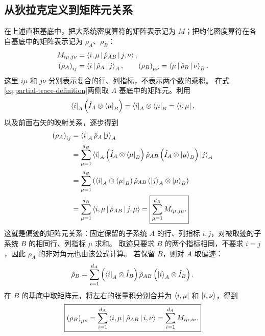 \subsection{从狄拉克定义到矩阵元关系}
在上述直积基底中，把大系统密度算符的矩阵表示记为 $M$；把约化密度算符在各自基底中的矩阵表示记为 $\rho_A$、$\rho_B$：
\begin{align}
M_{i\mu,j\nu}&=\Braket{i,\mu|\hat\rho_{AB}|j,\nu},\\
\left(\rho_A\right)_{ij}&=\Braket{i|\hat\rho_A|j}_A,\qquad
\left(\rho_B\right)_{\mu\nu}=\Braket{\mu|\hat\rho_B|\nu}_B.
\end{align}
这里 $i\mu$ 和 $j\nu$ 分别表示复合的行、列指标，不表示两个数的乘积。
在式\eqref{eq:partial-trace-definition}两侧取 $A$ 基底中的矩阵元。利用
\begin{equation}
\Bra{i}_A\left(\hat I_A\otimes\Bra{\mu}_B\right)
=\Bra{i}_A\otimes\Bra{\mu}_B=\Bra{i,\mu},
\end{equation}
以及前面右矢的映射关系，逐步得到
\begin{align}
\left(\rho_A\right)_{ij}
&=\Bra{i}_A\hat\rho_A\Ket{j}_A\notag\\
&=\sum_{\mu=1}^{d_B}
\Bra{i}_A\left(\hat I_A\otimes\Bra{\mu}_B\right)
\hat\rho_{AB}
\left(\hat I_A\otimes\Ket{\mu}_B\right)\Ket{j}_A\notag\\
&=\sum_{\mu=1}^{d_B}
\left(\Bra{i}_A\otimes\Bra{\mu}_B\right)
\hat\rho_{AB}
\left(\Ket{j}_A\otimes\Ket{\mu}_B\right)\notag\\
&=\sum_{\mu=1}^{d_B}\Braket{i,\mu|\hat\rho_{AB}|j,\mu}
=\boxed{\sum_{\mu=1}^{d_B}M_{i\mu,j\mu}.}
\label{eq:partial-trace-elements-A}
\end{align}
这就是偏迹的矩阵元关系：固定保留的子系统 $A$ 的行、列指标 $i,j$，对被取迹的子系统 $B$ 的相同行、列指标 $\mu$ 求和。
取迹只要求 $B$ 的两个指标相同，不要求 $i=j$，因此 $\rho_A$ 的非对角元也由该公式计算。
若保留 $B$，则对 $A$ 取偏迹：
\begin{equation}
\hat\rho_B=\sum_{i=1}^{d_A}
\left(\Bra{i}_A\otimes\hat I_B\right)
\hat\rho_{AB}
\left(\Ket{i}_A\otimes\hat I_B\right).
\end{equation}
在 $B$ 的基底中取矩阵元，将左右的张量积分别合并为 $\Bra{i,\mu}$ 和 $\Ket{i,\nu}$，得到
\begin{equation}
\boxed{\left(\rho_B\right)_{\mu\nu}
=\sum_{i=1}^{d_A}\Braket{i,\mu|\hat\rho_{AB}|i,\nu}
=\sum_{i=1}^{d_A}M_{i\mu,i\nu}.}
\label{eq:partial-trace-elements-B}
\end{equation}

